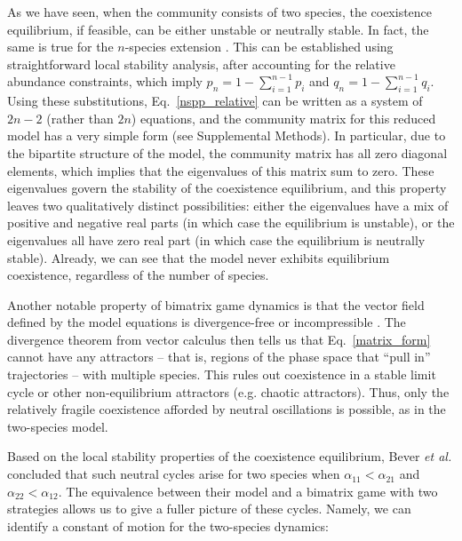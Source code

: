 \documentclass[11pt]{article}
\begin{document}
As we have seen, when the community consists of two species, the coexistence equilibrium, if feasible, can be either unstable or neutrally stable. In fact, the same is true for the $n$-species extension  \citep[and, more generally, for any bimatrix game dynamics,][]{eshel1983coevolutionary,selten1988note,hofbauer1998evolutionary}. This can be established using straightforward local stability analysis, after accounting for the relative abundance constraints, which imply $p_n = 1 - \sum_{i = 1}^{n-1} p_i$ and $q_n = 1 - \sum_{i = 1}^{n-1} q_i$. Using these substitutions, Eq.~\ref{nspp_relative} can be written as a system of $2 n - 2$ (rather than $2 n$) equations, and the community matrix for this reduced model has a very simple form (see Supplemental Methods). In particular, due to the bipartite structure of the model, the community matrix has all zero diagonal elements, which implies that the eigenvalues of this matrix sum to zero. These eigenvalues govern the stability of the coexistence equilibrium, and this property leaves two qualitatively distinct possibilities: either the eigenvalues have a mix of positive and negative real parts (in which case the equilibrium is unstable), or the eigenvalues all have zero real part (in which case the equilibrium is neutrally stable). Already, we can see that the model never exhibits equilibrium coexistence, regardless of the number of species.

Another notable property of bimatrix game dynamics is that the vector field defined by the model equations is divergence-free or incompressible \citep[see][for a proof]{hofbauer1998evolutionary}. The divergence theorem from vector calculus \citep{arfken1985mathematical} then tells us that Eq.~\ref{matrix_form} cannot have any attractors -- that is, regions of the phase space that ``pull in'' trajectories -- with multiple species. This rules out coexistence in a stable limit cycle or other non-equilibrium attractors (e.g. chaotic attractors). Thus, only the relatively fragile coexistence afforded by neutral oscillations is possible, as in the two-species model.

Based on the local stability properties of the coexistence equilibrium, Bever \textit{et al.} concluded that such neutral cycles arise for two species when $\alpha_{11} < \alpha_{21}$ and $\alpha_{22} < \alpha_{12}$. The equivalence between their model and a bimatrix game with two strategies allows us to give a fuller picture of these cycles. Namely, we can identify a constant of motion for the two-species dynamics:
\end{document}
